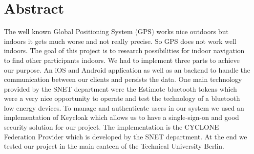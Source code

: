 \chapter*{Abstract}
\label{cha:abstract}

The well known Global Positioning System (GPS) works nice outdoors but indoors it gets much worse and not really precise. So GPS does not work well indoors. The goal of this project is to research possibilities for indoor navigation to find other participants indoors. We had to implement three parts to achieve our purpose. An iOS and Android application as well as an backend to handle the communication between our clients and persists the data. One main technology provided by the SNET department were the Estimote bluetooth tokens which were a very nice opportunity to operate and test the technology of a bluetooth low energy devices. To manage and authenticate users in our system we used an implementation of Keycloak which allows us to have a single-sign-on and good security solution for our project. The implementation is the CYCLONE Federation Provider which is developed by the SNET department. At the end we tested our project in the main canteen of the Technical University Berlin.
